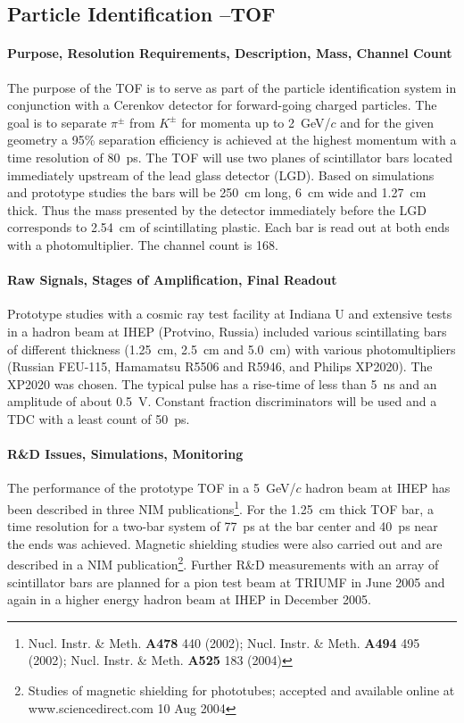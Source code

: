 \documentclass[11pt]{article}
\begin{document}
\subsection{Particle Identification --TOF}

\paragraph{Purpose, Resolution Requirements, Description, Mass, Channel Count}

The purpose of the TOF is to serve as part of the particle identification system in conjunction with a Cerenkov
detector for forward-going charged particles.  The goal is to separate $\pi^{\pm}$ from $K^{\pm}$ for momenta up to
2~GeV/$c$ and  for the given geometry a 95\% separation efficiency is achieved  at the highest momentum with a time
resolution of 80~ps.  The TOF will use two planes of scintillator bars located immediately upstream of the lead
glass detector (LGD).  Based on simulations and prototype studies the bars will be 250~cm long, 6~cm wide and
1.27~cm thick.  Thus the mass presented by the  detector immediately before the LGD corresponds to 2.54~cm of
scintillating plastic. Each bar is read out at both ends with a photomultiplier.  The channel count is 168.

\paragraph{Raw Signals, Stages of Amplification, Final Readout}

Prototype studies with a cosmic ray test facility at Indiana U and extensive tests in a hadron beam at IHEP
(Protvino, Russia) included various scintillating bars of different thickness (1.25~cm, 2.5~cm and 5.0~cm) with
various photomultipliers (Russian FEU-115, Hamamatsu R5506 and R5946, and Philips XP2020).  The XP2020 was
chosen.   The typical pulse has a rise-time of less than 5~ns and an amplitude of about 0.5~V.  Constant fraction
discriminators will be used and  a TDC with a least count of 50~ps.

\paragraph{R\&D Issues, Simulations, Monitoring}

The performance of the prototype TOF in a 5~GeV/$c$ hadron beam at IHEP has been described in three NIM 
publications\footnote{Nucl. Instr. \& Meth. \textbf{A478} 440 (2002);  Nucl. Instr. \& Meth. \textbf{A494} 495
(2002); Nucl. Instr. \& Meth. \textbf{A525} 183 (2004) }.  For the 1.25~cm thick TOF bar, a time resolution for a
two-bar system of 77~ps at the bar center and 40~ps near the ends was achieved.  Magnetic shielding studies were
also carried out and are described in a NIM publication\footnote{Studies of magnetic shielding for phototubes;
accepted and available online at www.sciencedirect.com 10 Aug 2004}.  Further R\&D measurements with an array of
scintillator bars are planned for a pion test beam at TRIUMF in June 2005 and again in a higher energy hadron beam
at IHEP in December 2005.
\end{document}
